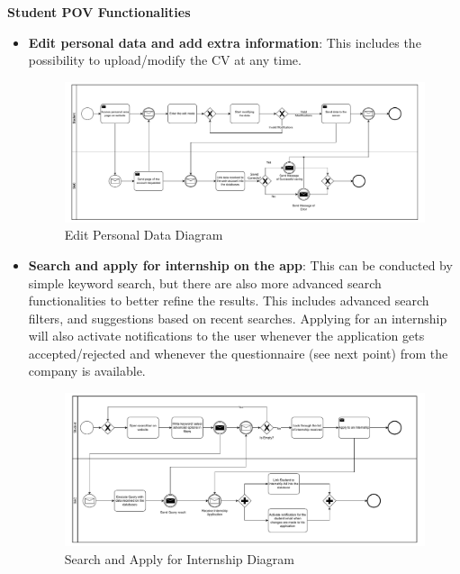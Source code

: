 \par\textbf{Student POV Functionalities}

\begin{itemize}
      \item \textbf{Edit personal data and add extra information}: This includes the possibility to upload/modify the
            CV at any time.

            \begin{figure}[H]
                  \centering
                  \includegraphics[width=1.0\textwidth]{Images/BPMN_3.pdf}
                  \caption{Edit Personal Data Diagram}
                  \label{fig:edit_personal_data_diagram}
            \end{figure}

      \item \textbf{Search and apply for internship on the app}: This can be conducted by simple keyword search, but
            there are also more advanced search functionalities to better refine the results. This includes advanced
            search filters, and suggestions based on recent searches. Applying for an internship will also activate
            notifications to the user whenever the application gets accepted/rejected and whenever the questionnaire
            (see next point) from the company is available.

            \begin{figure}[H]
                  \centering
                  \includegraphics[width=1.0\textwidth]{Images/BPMN_4.pdf}
                  \caption{Search and Apply for Internship Diagram}
                  \label{fig:search_and_apply_for_internship_diagram}
            \end{figure}


\end{itemize}
